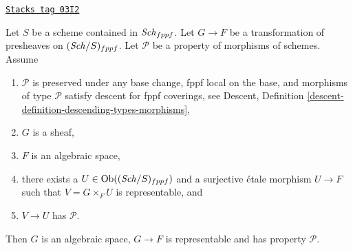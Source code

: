 \begin{lemma}
\label{spaces-lemma-morphism-sheaves-with-P-effective-descent-etale}
\href{https://stacks.math.columbia.edu/tag/03I2}{\texttt{Stacks tag 03I2}}

Let $S$ be a scheme contained in $\mathit{Sch}_{fppf}$.
Let $G \to F$ be a transformation of presheaves on $(\mathit{Sch}/S)_{fppf}$.
Let $\mathcal{P}$ be a property of morphisms of schemes.
Assume
\begin{enumerate}
\item $\mathcal{P}$ is preserved under any base change, fppf local on the
base, and morphisms of type $\mathcal{P}$ satisfy descent for fppf coverings,
see Descent, Definition \ref{descent-definition-descending-types-morphisms},
\item $G$ is a sheaf,
\item $F$ is an algebraic space,
\item there exists a $U \in \operatorname{Ob}((\mathit{Sch}/S)_{fppf})$
and a surjective \'etale morphism $U \to F$ such that
$V = G \times_F U$ is representable, and
\item $V \to U$ has $\mathcal{P}$.
\end{enumerate}
Then $G$ is an algebraic space, $G \to F$ is representable and has property
$\mathcal{P}$.
\end{lemma}

